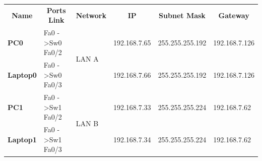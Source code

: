 \documentclass[11pt,a4paper]{report}
\begin{document}
\begin{table}[]
\begin{center}
\begin{tabular}{@{}llllll@{}}
\toprule
\multicolumn{1}{c}{\multirow{2}{*}{\textbf{Name}}} & \multicolumn{1}{c}{\multirow{2}{*}{\textbf{Ports Link}}} & \multicolumn{1}{c}{\multirow{2}{*}{\textbf{Network}}} & \multicolumn{1}{c}{\multirow{2}{*}{\textbf{IP}}} & \multicolumn{1}{c}{\multirow{2}{*}{\textbf{Subnet Mask}}} & \multicolumn{1}{c}{\multirow{2}{*}{\textbf{Gateway}}} \\
\multicolumn{1}{c}{}                               & \multicolumn{1}{c}{}                                     & \multicolumn{1}{c}{}                                  & \multicolumn{1}{c}{}                             & \multicolumn{1}{c}{}                                      & \multicolumn{1}{c}{}                                  \\ \midrule
\textbf{PC0}                                       & Fa0 -\textgreater Sw0 Fa0/2                              & \multirow{2}{*}{LAN A}                                & 192.168.7.65                                     & 255.255.255.192                                           & 192.168.7.126                                         \\ \cmidrule(r){1-2} \cmidrule(l){4-6}
\textbf{Laptop0}                                   & Fa0 -\textgreater Sw0 Fa0/3                              &                                                       & 192.168.7.66                                     & 255.255.255.192                                           & 192.168.7.126                                         \\ \midrule
\textbf{PC1}                                       & Fa0 -\textgreater Sw1 Fa0/2                              & \multirow{2}{*}{LAN B}                                & 192.168.7.33                                     & 255.255.255.224                                           & 192.168.7.62                                          \\ \cmidrule(r){1-2} \cmidrule(l){4-6}
\textbf{Laptop1}                                   & Fa0 -\textgreater Sw1 Fa0/3                              &                                                       & 192.168.7.34                                     & 255.255.255.224                                           & 192.168.7.62                                          \\ \midrule

\end{tabular}
\end{center}
\end{table}
\end{document}
